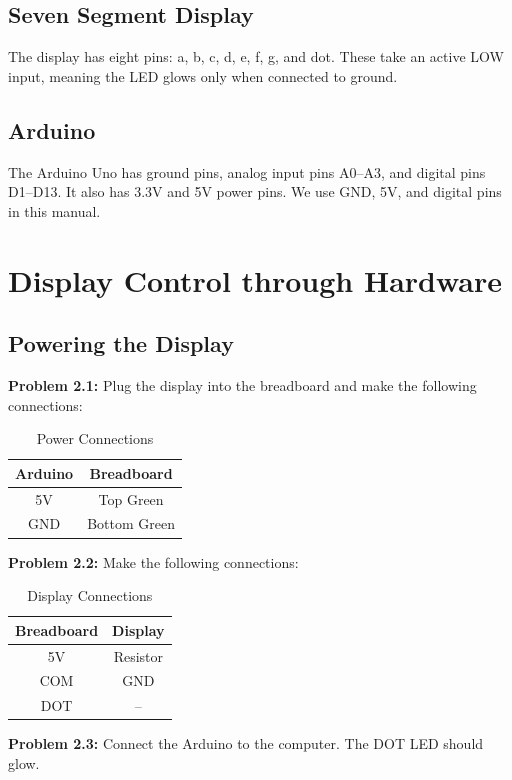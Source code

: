 \documentclass[12pt]{article}
\begin{document}
\subsection{Seven Segment Display}
The display has eight pins: a, b, c, d, e, f, g, and dot. These take an active LOW input, meaning the LED glows only when connected to ground.

\subsection{Arduino}
The Arduino Uno has ground pins, analog input pins A0–A3, and digital pins D1–D13. It also has 3.3V and 5V power pins. We use GND, 5V, and digital pins in this manual.

\section{Display Control through Hardware}

\subsection{Powering the Display}
\textbf{Problem 2.1:} Plug the display into the breadboard and make the following connections:

\begin{table}[h!]
\centering
\begin{tabular}{|c|c|}
\hline
\textbf{Arduino} & \textbf{Breadboard} \\
\hline
5V & Top Green \\
GND & Bottom Green \\
\hline
\end{tabular}
\caption{Power Connections}
\end{table}

\textbf{Problem 2.2:} Make the following connections:

\begin{table}[h!]
\centering
\begin{tabular}{|c|c|}
\hline
\textbf{Breadboard} & \textbf{Display} \\
\hline
5V & Resistor \\
COM & GND \\
DOT & -- \\
\hline
\end{tabular}
\caption{Display Connections}
\end{table}

\textbf{Problem 2.3:} Connect the Arduino to the computer. The DOT LED should glow.
\end{document}
